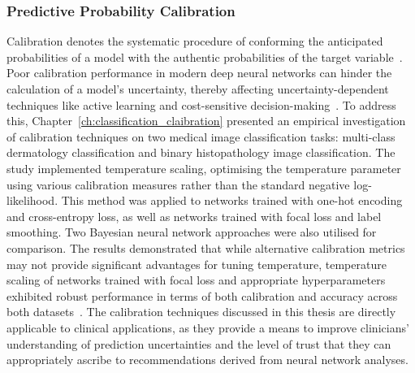 \subsubsection{Predictive Probability Calibration}
Calibration denotes the systematic procedure of conforming the anticipated probabilities of a model with the authentic probabilities of the target variable~\citep{guo2017calibration}. Poor calibration performance in modern deep neural networks can hinder the calculation of a model's uncertainty, thereby affecting uncertainty-dependent techniques like active learning and cost-sensitive decision-making~\citep{carse2021robust}. To address this, Chapter~\ref{ch:classification_claibration} presented an empirical investigation of calibration techniques on two medical image classification tasks: multi-class dermatology classification and binary histopathology image classification. The study implemented temperature scaling, optimising the temperature parameter using various calibration measures rather than the standard negative log-likelihood. This method was applied to networks trained with one-hot encoding and cross-entropy loss, as well as networks trained with focal loss and label smoothing. Two Bayesian neural network approaches were also utilised for comparison. The results demonstrated that while alternative calibration metrics may not provide significant advantages for tuning temperature, temperature scaling of networks trained with focal loss and appropriate hyperparameters exhibited robust performance in terms of both calibration and accuracy across both datasets~\citep{carse2022calibration}. The calibration techniques discussed in this thesis are directly applicable to clinical applications, as they provide a means to improve clinicians' understanding of prediction uncertainties and the level of trust that they can appropriately ascribe to recommendations derived from neural network analyses.

